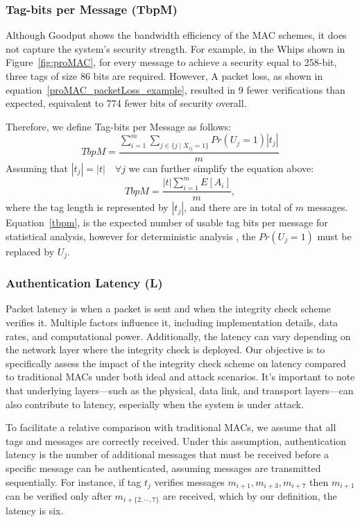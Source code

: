 \subsubsection{Tag-bits per Message (TbpM)}
Although Goodput shows the bandwidth efficiency of the MAC schemes, it does not capture the system's security strength. For example, in the Whips shown in Figure~\ref{fig:proMAC}, for every message to achieve a security equal to 258-bit, three tags of size 86 bits are required. However, A packet loss, as shown in equation~\eqref{proMAC_packetLoss_example}, resulted in 9 fewer verifications than expected, equivalent to 774 fewer bits of security overall.

Therefore, we define Tag-bits per Message as follows: 
\begin{equation}\label{tbpm}
    TbpM = \frac{\sum_{i  = 1}^m \sum_{j \in \{j \mid X_{ij} = 1 \} } Pr(U_j=1)|t_j|}{m}
\end{equation}
Assuming that  $|t_j| = |t| \quad \forall j $ we can further simplify the equation above:
\begin{equation}
    TbpM = \frac{|t|\sum_{i  = 1}^m E[A_i]}{m},
\end{equation}
where the tag length is represented by $|t_j|$, and there are in total of $m$ messages.
Equation~\eqref{tbpm}, is the expected number of usable tag bits per message for statistical analysis, however for deterministic analysis , the $Pr(U_j=1)$ must be replaced by $U_j$.

\subsubsection{Authentication Latency (L)}
Packet latency is when a packet is sent and when the integrity check scheme verifies it. Multiple factors influence it, including implementation details, data rates, and computational power. Additionally, the latency can vary depending on the network layer where the integrity check is deployed. Our objective is to specifically assess the impact of the integrity check scheme on latency compared to traditional MACs under both ideal and attack scenarios. It's important to note that underlying layers—such as the physical, data link, and transport layers—can also contribute to latency, especially when the system is under attack.

To facilitate a relative comparison with traditional MACs, we assume that all tags and messages are correctly received. Under this assumption, authentication latency is the number of additional messages that must be received before a specific message can be authenticated, assuming messages are transmitted sequentially. For instance, if tag $t_j$ verifies messages \( m_{i+1}, m_{i+3}, m_{i+7} \) then \( m_{i+1}\) can be verified only after \( m_{i+\{2,\cdots,7\}} \) are received, which by our definition, the latency is six.


